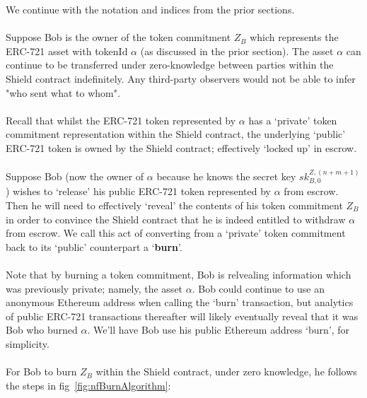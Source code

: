 \documentclass{article}
\begin{document}
We continue with the notation and indices from the prior sections.\\
\\
Suppose Bob is the owner of the token commitment $Z_B$ which represents the ERC-721 asset with tokenId $\alpha$ (as discussed in the prior section).
The asset $\alpha$ can continue to be transferred under zero-knowledge between parties within the Shield contract indefinitely.
Any third-party observers would not be able to infer "who sent what to whom".\\
\\
Recall that whilst the ERC-721 token represented by $\alpha$ has a `private' token commitment representation within the Shield contract, the underlying `public' ERC-721 token is owned by the Shield contract; effectively `locked up' in escrow.\\
\\
Suppose Bob (now the owner of $\alpha$ because he knows the secret key $sk^{Z,(n+m+1)}_{B,0}$) wishes to `release' his public ERC-721 token represented by $\alpha$ from escrow.
Then he will need to effectively `reveal' the contents of his token commitment $Z_B$ in order to convince the Shield contract that he is indeed entitled to withdraw $\alpha$ from escrow.
We call this act of converting from a `private' token commitment back to its `public' counterpart a `\textbf{burn}'.\\
\\
Note that by burning a token commitment, Bob is relvealing information which was previously private; namely, the asset $\alpha$. Bob could continue to use an anonymous Ethereum address when calling the `burn' transaction, but analytics of public ERC-721 transactions thereafter will likely eventually reveal that it was Bob who burned $\alpha$. We'll have Bob use his public Ethereum address `burn', for simplicity.\\
\\

\noindent
For Bob to burn $Z_B$ within the Shield contract, under zero knowledge, he follows the steps in fig~\ref{fig:nfBurnAlgorithm}:
\end{document}
